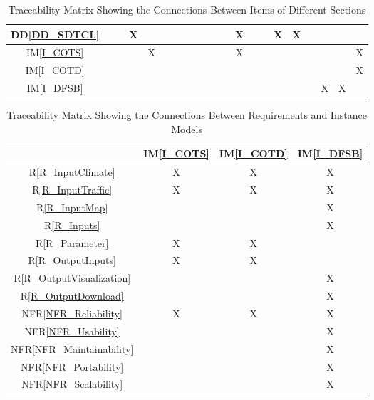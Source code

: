 \documentclass[12pt]{article}
\newcommand{\ddref}[1]{DD\ref{#1}}
\newcommand{\iref}[1]{IM\ref{#1}}
\newcommand{\rref}[1]{R\ref{#1}}
\newcommand{\nfrref}[1]{NFR\ref{#1}}
\begin{document}
\begin{landscape}
\begin{table}[h]
\begin{tabular}{|c|c|c|c|c|c|c|c|c|c|c|c|c|c|c|c|c|c|c|c|c|}
\ddref{DD_SDTCL}    &  &  & X & & &  & &  &  &  &  & X & &  &  X&X &&  & & \\ \hline
\iref{I_COTS}        &  &  &  & X & &  & &  &  &  &  &  X & &  &  & &&  & & X \\ \hline
\iref{I_COTD}        &  &  &  & & &  & &  &  &  &  & & &  &  & &&  & & X \\ \hline
\iref{I_DFSB}       &  &  &  & & &  & &  &  &  &  & & &  &  & &&  X & X & \\ \hline
\hline
\end{tabular}
\caption{Traceability Matrix Showing the Connections Between Items of Different Sections}
\label{Table:A_trace}
\end{table}
 \end{landscape}

\newpage
\begin{table}[H]
\centering
\begin{tabular}{|c|c|c|c|}
\hline 
	& \iref{I_COTS} & \iref{I_COTD} & \iref{I_DFSB}  \\

\hline
\rref{R_InputClimate} & X & X & X \\ \hline
\rref{R_InputTraffic} & X & X & X \\ \hline
\rref{R_InputMap} & & & X  \\ \hline
\rref{R_Inputs}     & & & X \\ \hline
\rref{R_Parameter} & X & X &  \\ \hline
\rref{R_OutputInputs} & X  &X & \\ \hline
\rref{R_OutputVisualization} & & & X\\ \hline
\rref{R_OutputDownload} &  & & X\\ \hline
\nfrref{NFR_Reliability}   & X & X & X \\ \hline
\nfrref{NFR_Usability}   & & & X \\ \hline
\nfrref{NFR_Maintainability}   & & & X \\ \hline
\nfrref{NFR_Portability}   & & & X \\ \hline
\nfrref{NFR_Scalability}   & & & X \\
\hline
\end{tabular}
\caption{Traceability Matrix Showing the Connections Between Requirements and Instance Models}
\label{Table:R_trace}
\end{table}


\newpage
\end{document}
